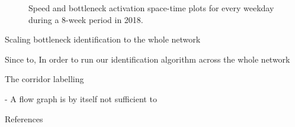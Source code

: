 \documentclass[final]{beamer}
\newlength{\colwidth}
\begin{document}
\begin{frame}[t]
\begin{columns}[t]
\begin{column}{\colwidth}

  \begin{figure}[b]
    \centering
    \caption{Speed and bottleneck activation space-time plots for every weekday
             during a 8-week period in 2018.}
    \label{fig:motivating_example_8weeksplots}
  \end{figure}

  \begin{block}{Scaling bottleneck identification to the whole network}


      Since to,
      In order to run our identification algorithm across the whole network

      The corridor labelling

      - A flow graph is by itself not sufficient to


  \end{block}

  \begin{block}{References}

    \footnotesize{}


\end{block}
\end{column}
\end{columns}
\end{frame}
\end{document}
